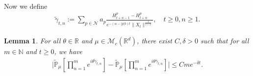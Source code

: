 \documentclass[12pt,a4paper]{amsart}
\theoremstyle{plain}
\newtheorem{lem}[thm]{Lemma}
\theoremstyle{definition}
\numberwithin{equation}{section}
\begin{document}
Now we define
\begin{align}
  \widetilde{\gamma}_{t,n}
  :=\sum_{p\in \mathcal{N} } a_p \frac { H^p_{t+n-1} - H^p_{t+n} } { e^{-(\alpha-|p|b)t} \| X_{t} \|^{ \frac{1}{1+\beta}}},
  \quad t\geq 0, n\geq 1.
\end{align}
\begin{lem}
  \label{lem: lemma04}
  For all $\theta\in \mathbb{R}$ and $\mu\in \mathcal{M}_c(\mathbb{R}^d)$, there exist $C,\delta>0$ such that for all $m\in \mathbb{N}$ and $t\geq 0$, we have
  \begin{align}
    \Big|\widetilde{\mathbb{P}}_{\mu}[\prod_{n=1}^m e^{i\theta \widetilde{\gamma}_{t,n}}]-\widetilde{\mathbb{P}}_{\mu}[\prod_{n=1}^me^{i\theta \bar{\gamma}_{t,n}}]\Big|
    \leq C m e^{-\delta t}.
  \end{align}
\end{lem}
\end{document}
